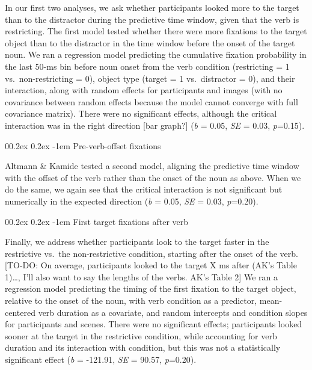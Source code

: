 \documentclass[
  man,floatsintext]{apa6}
\makeatletter
\let\oldparagraph\paragraph
\renewcommand{\paragraph}[1]{\oldparagraph{#1}\mbox{}}
\renewcommand{\paragraph}{\@startsection{paragraph}{4}{\parindent}%
  {0\baselineskip \@plus 0.2ex \@minus 0.2ex}%
  {-1em}%
  {\normalfont\normalsize\bfseries\itshape\typesectitle}}
\makeatother
\begin{document}
In our first two analyses, we ask whether participants looked more to the target than to the distractor during the predictive time window, given that the verb is restricting. The first model tested whether there were more fixations to the target object than to the distractor in the time window before the onset of the target noun. We ran a regression model predicting the cumulative fixation probability in the last 50-ms bin before noun onset from the verb condition (restricting = 1 vs.~non-restricting = 0), object type (target = 1 vs.~distractor = 0), and their interaction, along with random effects for participants and images (with no covariance between random effects because the model cannot converge with full covariance matrix). There were no significant effects, although the critical interaction was in the right direction {[}bar graph?{]} (\emph{b} = 0.05, \emph{SE} = 0.03, \emph{p}=0.15).

\hypertarget{pre-verb-offset-fixations}{%
\paragraph{Pre-verb-offset fixations}\label{pre-verb-offset-fixations}}

Altmann \& Kamide tested a second model, aligning the predictive time window with the offset of the verb rather than the onset of the noun as above. When we do the same, we again see that the critical interaction is not significant but numerically in the expected direction (\emph{b} = 0.05, \emph{SE} = 0.03, \emph{p}=0.20).

\hypertarget{first-target-fixations-after-verb}{%
\paragraph{First target fixations after verb}\label{first-target-fixations-after-verb}}

Finally, we address whether participants look to the target faster in the restrictive vs.~the non-restrictive condition, starting after the onset of the verb. {[}TO-DO: On average, participants looked to the target X ms after (AK's Table 1)\ldots, I'll also want to say the lengths of the verbs. AK's Table 2{]} We ran a regression model predicting the timing of the first fixation to the target object, relative to the onset of the noun, with verb condition as a predictor, mean-centered verb duration as a covariate, and random intercepts and condition slopes for participants and scenes. There were no significant effects; participants looked sooner at the target in the restrictive condition, while accounting for verb duration and its interaction with condition, but this was not a statistically significant effect (\emph{b} = -121.91, \emph{SE} = 90.57, \emph{p}=0.20).
\end{document}
